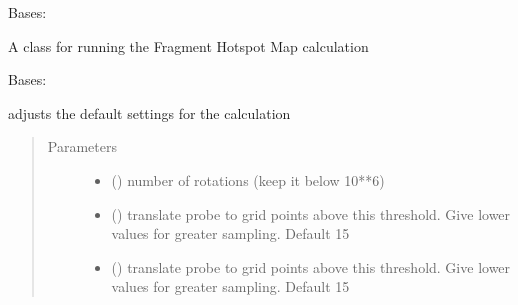 \documentclass[letterpaper,10pt,english]{sphinxmanual}
\begin{document}
\begin{fulllineitems}
\label{\detokenize{calculation_api:hotspots.calculation.Runner}}
Bases: 

A class for running the Fragment Hotspot Map calculation

\begin{fulllineitems}
\label{\detokenize{calculation_api:hotspots.calculation.Runner.Settings}}
Bases: 

adjusts the default settings for the calculation
\begin{quote}\begin{description}
\item[{Parameters}] \leavevmode\begin{itemize}
\item {} 
 () \textendash{} number of rotations (keep it below 10**6)

\item {} 
 () \textendash{} translate probe to grid points above this threshold. Give lower values for greater sampling. Default 15

\item {} 
 () \textendash{} translate probe to grid points above this threshold. Give lower values for greater sampling. Default 15


\end{itemize}
\end{description}
\end{quote}
\end{fulllineitems}
\end{fulllineitems}
\end{document}
